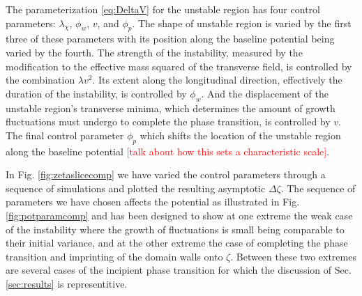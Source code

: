 The parameterization \eqref{eq:DeltaV} for the unstable region has four control parameters: $\lambda_\chi$, $\phi_w$, $v$, and $\phi_p$. The shape of unstable region is varied by the first three of these parameters with its position along the baseline potential being varied by the fourth. The strength of the instability, measured by the modification to the effective mass squared of the transverse field, is controlled by the combination $\lambda v^2$. Its extent along the longitudinal direction, effectively the duration of the instability, is controlled by $\phi_w$. And the displacement of the unstable region's transverse minima, which determines the amount of growth fluctuations must undergo to complete the phase transition, is controlled by $v$. The final control parameter $\phi_p$ which shifts the location of the unstable region along the baseline potential \textcolor{red}{[talk about how this sets a characteristic scale]}.

In Fig. \ref{fig:zetaslicecomp} we have varied the control parameters through a sequence of simulations and plotted the resulting asymptotic $\Delta\zeta$. The sequence of parameters we have chosen affects the potential as illustrated in Fig. \ref{fig:potparamcomp} and has been designed to show at one extreme the weak case of the instability where the growth of fluctuations is small being comparable to their initial variance, and at the other extreme the case of completing the phase transition and imprinting of the domain walls onto $\zeta$. Between these two extremes are several cases of the incipient phase transition for which the discussion of Sec. \ref{sec:results} is representitive.

